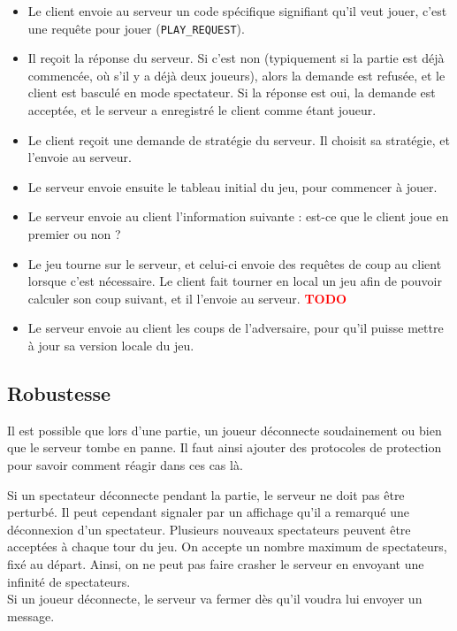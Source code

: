 \documentclass[a4paper]{article}
\newcommand{\TODO}{\textcolor{red}{\textbf{TODO}}}
\begin{document}
%
\begin{itemize}
	\setlength\itemsep{0.5em}
	\item Le client envoie au serveur un code spécifique signifiant qu'il veut jouer, c'est une requête pour jouer (\texttt{PLAY\_REQUEST}).
	\item Il reçoit la réponse du serveur. Si c'est non (typiquement si la partie est déjà commencée, où s'il y a déjà deux joueurs), alors la demande est refusée, et le client est basculé en mode spectateur. Si la réponse est oui, la demande est acceptée, et le serveur a enregistré le client comme étant joueur.
	\item Le client reçoit une demande de stratégie du serveur. Il choisit sa stratégie, et l'envoie au serveur.
	\item Le serveur envoie ensuite le tableau initial du jeu, pour commencer à jouer.
	\item Le serveur envoie au client l'information suivante : est-ce que le client joue en premier ou non ?
	\item Le jeu tourne sur le serveur, et celui-ci envoie des requêtes de coup au client lorsque c'est nécessaire. Le client fait tourner en local un jeu afin de pouvoir calculer son coup suivant, et il l'envoie au serveur. \TODO
	\item Le serveur envoie au client les coups de l'adversaire, pour qu'il puisse mettre à jour sa version locale du jeu.
\end{itemize}
%


\subsection{Robustesse}

Il est possible que lors d'une partie, un joueur déconnecte soudainement ou 
bien que le serveur tombe en panne. Il faut ainsi ajouter des protocoles de 
protection pour savoir comment réagir dans ces cas là.

Si un spectateur déconnecte pendant la partie, le serveur ne doit pas être 
perturbé. Il peut cependant signaler par un affichage qu'il a remarqué une 
déconnexion d'un spectateur.
Plusieurs nouveaux spectateurs peuvent être acceptées à chaque tour du jeu. On accepte un nombre maximum de spectateurs, fixé au départ.
Ainsi, on ne peut pas faire crasher le serveur en envoyant une infinité de spectateurs. \\

Si un joueur déconnecte, le serveur va fermer dès qu'il voudra lui envoyer un message. \\
\end{document}
